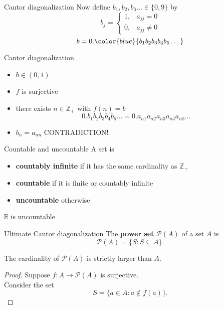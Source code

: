 \documentclass{beamer}
\begin{document}
\begin{frame}{Cantor diagonalization}
Now define $b_1,b_2,b_3\dots\in \{0,9\}$ by
$$b_j = \left\lbrace
\begin{array}{cc}
1, & a_{jj} = 0\\
0, & a_{jj} \neq 0
\end{array}\right.$$
\pause
$$b = 0.{\color{blue}{b_1b_2b_3b_4b_5\dots}}$$
\end{frame}

\begin{frame}{Cantor diagonalization}
\begin{itemize}
\item $b\in (0,1)$
\pause
\item $f$ is surjective
\pause
\item there exists $n\in\mathbb{Z}_+$ with $f(n) = b$
\pause
$$0.b_1b_2b_3b_4b_5\dots = 0.a_{n1}a_{n2}a_{n3}a_{n4}a_{n5}\dots$$
\pause
\item $b_n = a_{nn}$ \pause CONTRADICTION!
\end{itemize}
\end{frame}

\begin{frame}{Countable and uncountable}
A set is
\begin{itemize}
\pause
\item \textbf{countably infinite} if it has the same cardinality as $\mathbb{Z}_+$
\pause
\item \textbf{countable} if it is finite or countably infinite
\pause
\item \textbf{uncountable} otherwise
\end{itemize}
\pause
\begin{thm}
$\mathbb{R}$ is uncountable
\end{thm}
\end{frame}

\begin{frame}{Ultimate Cantor diagonalization}
The \textbf{power set}  $\mathcal{P}(A)$ of a set $A$ is
$$\mathcal P(A) = \{S: S\subseteq A\}.$$
\pause
\begin{thm}
The cardinality of $\mathcal P(A)$ is strictly larger than $A$.
\end{thm}
\pause
\begin{proof}
\pause
Suppose $f: A\rightarrow \mathcal P(A)$ is surjective.\\
\pause
Consider the set
$$S = \{a\in A: a\notin f(a)\}.$$
\end{proof}
\end{frame}
\end{document}
